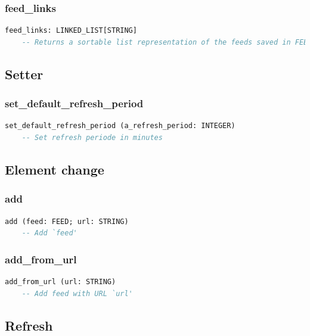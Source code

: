 \subsubsection{feed\_links}

\begin{lstlisting}[language=Eiffel]
feed_links: LINKED_LIST[STRING]
    -- Returns a sortable list representation of the feeds saved in FEED_MANAGER
\end{lstlisting}


\subsection{Setter}
\label{sec:feed-manager-setter}

\subsubsection{set\_default\_refresh\_period}

\begin{lstlisting}[language=Eiffel]
set_default_refresh_period (a_refresh_period: INTEGER)
    -- Set refresh periode in minutes
\end{lstlisting}


\subsection{Element change}
\label{sec:feed-manager-element-change}

\subsubsection{add}

\begin{lstlisting}[language=Eiffel]
add (feed: FEED; url: STRING)
    -- Add `feed'
\end{lstlisting}

\subsubsection{add\_from\_url}

\begin{lstlisting}[language=Eiffel]
add_from_url (url: STRING)
    -- Add feed with URL `url'
\end{lstlisting}


\subsection{Refresh}
\label{sec:feed-manager-refresh}

